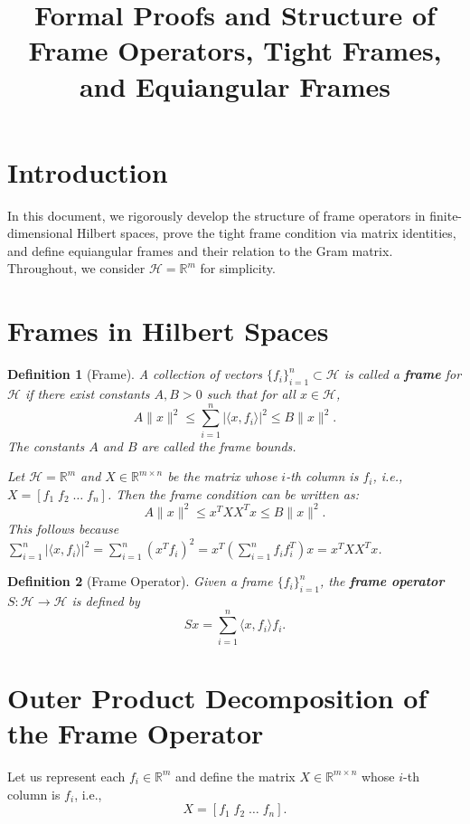 \documentclass[12pt]{article}
\title{Formal Proofs and Structure of Frame Operators, Tight Frames, and Equiangular Frames}
\author{}
\date{}
\newtheorem{definition}{Definition}
\begin{document}
\maketitle

\section{Introduction}

In this document, we rigorously develop the structure of frame operators in finite-dimensional Hilbert spaces, prove the tight frame condition via matrix identities, and define equiangular frames and their relation to the Gram matrix. Throughout, we consider $\mathcal{H} = \mathbb{R}^m$ for simplicity.

\section{Frames in Hilbert Spaces}

\begin{definition}[Frame]
A collection of vectors $\{f_i\}_{i=1}^n \subset \mathcal{H}$ is called a \textbf{frame} for $\mathcal{H}$ if there exist constants $A, B > 0$ such that for all $x \in \mathcal{H}$,
\[
A \|x\|^2 \leq \sum_{i=1}^n |\langle x, f_i \rangle|^2 \leq B \|x\|^2.
\]
The constants $A$ and $B$ are called the \emph{frame bounds}.

Let $\mathcal{H} = \mathbb{R}^m$ and $X \in \mathbb{R}^{m \times n}$ be the matrix whose $i$-th column is $f_i$, i.e., $X = [f_1 \; f_2 \; \dots \; f_n]$. Then the frame condition can be written as:
\[
A \|x\|^2 \leq x^T X X^T x \leq B \|x\|^2.
\]
This follows because $\sum_{i=1}^n |\langle x, f_i \rangle|^2 = \sum_{i=1}^n (x^T f_i)^2 = x^T \left(\sum_{i=1}^n f_i f_i^T\right) x = x^T X X^T x$.

\end{definition}

\begin{definition}[Frame Operator]
Given a frame $\{f_i\}_{i=1}^n$, the \textbf{frame operator} $S: \mathcal{H} \to \mathcal{H}$ is defined by
\[
Sx = \sum_{i=1}^n \langle x, f_i \rangle f_i.
\]
\end{definition}

\section{Outer Product Decomposition of the Frame Operator}

Let us represent each $f_i \in \mathbb{R}^m$ and define the matrix $X \in \mathbb{R}^{m \times n}$ whose $i$-th column is $f_i$, i.e.,
\[
X = [f_1 \; f_2 \; \dots \; f_n].
\]
\end{document}
